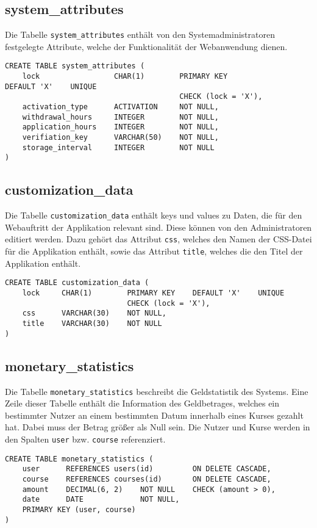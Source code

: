 \subsection{system\_attributes}
Die Tabelle \texttt{system\_attributes} enthält von den Systemadministratoren festgelegte Attribute, welche der Funktionalität der Webanwendung dienen.

\begin{verbatim}
CREATE TABLE system_attributes (
    lock                 CHAR(1)        PRIMARY KEY    									 DEFAULT 'X'    UNIQUE
                                        CHECK (lock = 'X'),
    activation_type      ACTIVATION     NOT NULL,
    withdrawal_hours     INTEGER        NOT NULL,
    application_hours    INTEGER        NOT NULL,
    verifiation_key      VARCHAR(50)    NOT NULL,
    storage_interval     INTEGER        NOT NULL
)
\end{verbatim}

\subsection{customization\_data}
Die Tabelle \texttt{customization\_data} enthält keys und values zu Daten, die für den Webauftritt der Applikation relevant sind. Diese können von den Administratoren editiert werden. Dazu gehört das Attribut \texttt{css}, welches den Namen der CSS-Datei für die Applikation enthält, sowie das Attribut \texttt{title}, welches die den Titel der Applikation enthält.

\begin{verbatim}
CREATE TABLE customization_data (
    lock     CHAR(1)        PRIMARY KEY    DEFAULT 'X'    UNIQUE
                            CHECK (lock = 'X'),
    css      VARCHAR(30)    NOT NULL,
    title    VARCHAR(30)    NOT NULL
)
\end{verbatim}

\subsection{monetary\_statistics}
Die Tabelle \texttt{monetary\_statistics} beschreibt die Geldstatistik des Systems. Eine Zeile dieser Tabelle enthält die Information des Geldbetrages, welches ein bestimmter Nutzer an einem bestimmten Datum innerhalb eines Kurses gezahlt hat. Dabei muss der Betrag größer als Null sein. Die Nutzer und Kurse werden in den Spalten \texttt{user} bzw. \texttt{course} referenziert.

\begin{verbatim}
CREATE TABLE monetary_statistics (
    user      REFERENCES users(id)         ON DELETE CASCADE,
    course    REFERENCES courses(id)       ON DELETE CASCADE,
    amount    DECIMAL(6, 2)    NOT NULL    CHECK (amount > 0),
    date      DATE             NOT NULL,
    PRIMARY KEY (user, course)
)
\end{verbatim}

